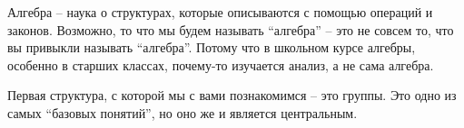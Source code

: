 \documentclass[10pt, twoside]{article}
\begin{document}
\pagestyle{empty}

\newpage

\tableofcontents
\newpage

\setcounter{page}{1}
\pagestyle{fancy}

Алгебра -- наука о структурах, которые описываются с помощью операций и законов. 
Возможно, то что мы будем называть ``алгебра'' -- это не совсем то, что вы привыкли называть ``алгебра''. 
Потому что в школьном курсе алгебры, особенно в старших классах, почему-то изучается анализ, а не сама алгебра.

Первая структура, с которой мы с вами познакомимся -- это группы.
Это одно из самых ``базовых понятий'', но оно же и является центральным. 





















\end{document}
